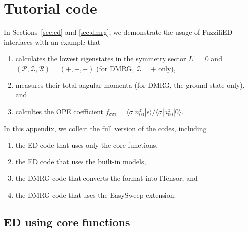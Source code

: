\documentclass{timesjhep}
\begin{document}
\section{Tutorial code}
\label{app:code}

In Sections~\ref{sec:ed} and \ref{sec:dmrg}, we demonstrate the usage of FuzzifiED interfaces with an example that
\begin{enumerate}
    \item calculates the lowest eigenstates in the symmetry sector $L^z=0$ and $(\mathcal{P},\mathcal{Z},\mathcal{R})=(+,+,+)$ (for DMRG, $\mathcal{Z}=+$ only),
    \item measures their total angular momenta (for DMRG, the ground state only), and
    \item calcultes the OPE coefficient $f_{\sigma\sigma\epsilon}=\langle \sigma|n^z_{00}|\epsilon\rangle/\langle \sigma|n^z_{00}|0\rangle$.
\end{enumerate}
In this appendix, we collect the full version of the codes, including
\begin{enumerate}
    \item the ED code that uses only the core functions,
    \item the ED code that uses the built-in models,
    \item the DMRG code that converts the format into ITensor, and
    \item the DMRG code that uses the EasySweep extension.
\end{enumerate}

\subsection{ED using core functions}
\label{app:code_ed1}
\end{document}
